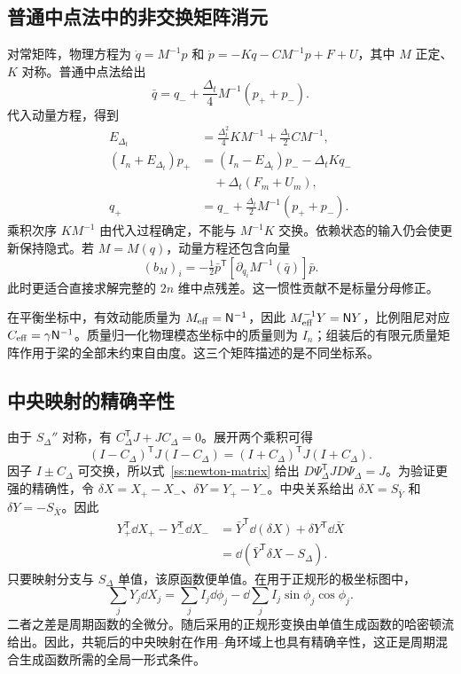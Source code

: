 \subsection{普通中点法中的非交换矩阵消元}
\label{ss:matrix}

对常矩阵，物理方程为
$\dot q=M^{-1}p$ 和
$\dot p=-Kq-CM^{-1}p+F+U$，其中 $M$ 正定、$K$ 对称。普通中点法给出
\[
 \bar q=q_-+\frac{\Delta_t}{4}M^{-1}(p_++p_-).
\]
代入动量方程，得到
\begin{equation}\label{ss:matrix-elimination}
\begin{aligned}
 E_{\Delta_t}&=\tfrac{\Delta_t^2}{4}KM^{-1}
                            +\tfrac{\Delta_t}{2}CM^{-1},\\
 (I_n+E_{\Delta_t})p_+
   &=(I_n-E_{\Delta_t})p_--\Delta_tKq_-\\
   &\quad+\Delta_t(F_m+U_m),\\
 q_+&=q_-+\tfrac{\Delta_t}{2}M^{-1}(p_++p_-).
\end{aligned}
\end{equation}
乘积次序 $KM^{-1}$ 由代入过程确定，不能与 $M^{-1}K$ 交换。依赖状态的输入仍会使更新保持隐式。若 $M=M(q)$，动量方程还包含向量
\[
 (b_M)_i=-\tfrac12\bar p^{\mathsf T}
       [\partial_{q_i}M^{-1}(\bar q)]\bar p.
\]
此时更适合直接求解完整的 $2n$ 维中点残差。这一惯性贡献不是标量分母修正。

在平衡坐标中，有效动能质量为 $M_{\rm eff}=\mathsf N^{-1}$，因此 $M_{\rm eff}^{-1}Y=\mathsf N Y$，比例阻尼对应 $C_{\rm eff}=\gamma\mathsf N^{-1}$。质量归一化物理模态坐标中的质量则为 $I_n$；组装后的有限元质量矩阵作用于梁的全部未约束自由度。这三个矩阵描述的是不同坐标系。

\subsection{中央映射的精确辛性}
\label{ss:exact-symplectic}

由于 $S_\Delta''$ 对称，有 $C_\Delta^{\mathsf T}J+JC_\Delta=0$。展开两个乘积可得
\[
 (I-C_\Delta)^{\mathsf T}J(I-C_\Delta)
 =(I+C_\Delta)^{\mathsf T}J(I+C_\Delta).
\]
因子 $I\pm C_\Delta$ 可交换，所以式~\eqref{ss:newton-matrix} 给出 $D\Psi_\Delta^{\mathsf T}JD\Psi_\Delta=J$。为验证更强的精确性，令 $\delta X=X_+-X_-$、$\delta Y=Y_+-Y_-$。中央关系给出 $\delta X=S_{\bar Y}$ 和 $\delta Y=-S_{\bar X}$。因此
\begin{equation}\label{ss:primitive}
\begin{aligned}
 Y_+^{\mathsf T}\dd X_+-Y_-^{\mathsf T}\dd X_-
 &=\bar Y^{\mathsf T}\dd(\delta X)+\delta Y^{\mathsf T}\dd\bar X\\
 &=\dd(\bar Y^{\mathsf T}\delta X-S_\Delta).
\end{aligned}
\end{equation}
只要映射分支与 $S_\Delta$ 单值，该原函数便单值。在用于正规形的极坐标图中，
\[
 \sum_jY_j\dd X_j
   =\sum_j I_j\dd\phi_j
      -\dd\sum_j I_j\sin\phi_j\cos\phi_j.
\]
二者之差是周期函数的全微分。随后采用的正规形变换由单值生成函数的哈密顿流给出。因此，共轭后的中央映射在作用--角环域上也具有精确辛性，这正是周期混合生成函数所需的全局一形式条件。

